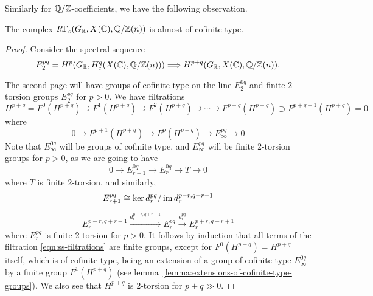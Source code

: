 \documentclass{article}
\numberwithin{equation}{section}
\begin{document}
Similarly for $\mathbb{Q}/\mathbb{Z}$-coefficients, we have the following observation.

\begin{lemma}
  \label{lemma:RGammac(GR,X(C),Q/Z(n))-almost-cofinite-type}
  The complex $R\Gamma_c (G_{\mathbb{R}}, X (\mathbb{C}), \mathbb{Q}/\mathbb{Z} (n))$
  is almost of cofinite type.

  \begin{proof}
    Consider the spectral sequence
    \[ E_2^{pq} = H^p (G_{\mathbb{R}}, H^q_c (X (\mathbb{C}), \mathbb{Q}/\mathbb{Z} (n)))
    \Longrightarrow
    H^{p+q} (G_{\mathbb{R}}, X (\mathbb{C}), \mathbb{Q}/\mathbb{Z} (n)). \]

    The second page will have groups of cofinite type on the line $E_2^{0q}$ and
    finite $2$-torsion groups $E_2^{pq}$ for $p > 0$. We have filtrations
    \begin{equation}
      \label{eqn:ss-filtrations}
      H^{p+q} = F^0 (H^{p+q}) \supseteq
      F^1 (H^{p+q}) \supseteq
      F^2 (H^{p+q}) \supseteq \cdots \supseteq
      F^{p+q} (H^{p+q}) \supset F^{p+q+1} (H^{p+q}) = 0
    \end{equation}
    where
    $$0 \to F^{p+1} (H^{p+q}) \to F^p (H^{p+q}) \to E_\infty^{pq} \to 0$$
    Note that $E^{0q}_\infty$ will be groups of cofinite type, and
    $E^{pq}_\infty$ will be finite $2$-torsion groups for $p > 0$, as we are
    going to have
    $$0 \to E_{r+1}^{0q} \to E_r^{0q} \to T \to 0$$
    where $T$ is finite $2$-torsion, and similarly,
    $$E_{r+1}^{pq} \cong \ker d_r^{pq} / \operatorname{im} d_r^{p-r,q+r-1}$$

    \[ E_r^{p-r,q+r-1} \xrightarrow{d_r^{p-r,q+r-1}}
    E_r^{pq} \xrightarrow{d_r^{pq}} E_r^{p+r,q-r+1} \]
    where $E_r^{pq}$ is finite $2$-torsion for $p > 0$. It follows by induction
    that all terms of the filtration \eqref{eqn:ss-filtrations} are finite
    groups, except for $F^0 (H^{p+q}) = H^{p+q}$ itself, which is of cofinite
    type, being an extension of a group of cofinite type $E_\infty^{0q}$ by a
    finite group $F^1 (H^{p+q})$
    (see lemma~\ref{lemma:extensions-of-cofinite-type-groups}). We also see that
    $H^{p+q}$ is $2$-torsion for $p+q \gg 0$.
  \end{proof}
\end{lemma}
\end{document}
